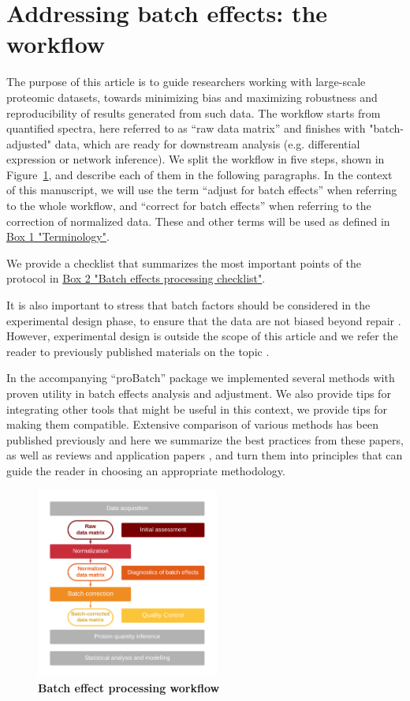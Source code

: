 \documentclass[num-refs]{wiley-article}
\begin{document}
\section{Addressing batch effects: the workflow}

The purpose of this article is to guide researchers working with large-scale proteomic datasets, towards minimizing bias and maximizing robustness and reproducibility of results generated from such data. The workflow starts from quantified spectra, here referred to as “raw data matrix” and finishes with "batch-adjusted" data, which are ready for downstream analysis (e.g. differential expression or network inference). We split the workflow in five steps, shown in Figure~\ref{fig:batch_fig1_workflow}, and describe each of them in the following paragraphs. In the context of this manuscript, we will use the term “adjust for batch effects” when referring to the whole workflow, and “correct for batch effects” when referring to the correction of normalized data. These and other terms will be used as defined in \hyperref[box:Box1_definitions]{Box 1 "Terminology"}. 

We provide a checklist that summarizes the most important points of the protocol in \hyperref[box:Box2_checklist]{Box 2 "Batch effects processing checklist"}.

It is also important to stress that batch factors should be considered in the experimental design phase, to ensure that the data are not biased beyond repair  \cite{Hu2005, Gilad2015}. However, experimental design is outside the scope of this article and we refer the reader to previously published materials on the topic \cite{Oberg2009, Cuklina2020}.
 
In the accompanying “proBatch” package we implemented several methods with proven utility in batch effects analysis and adjustment. We also provide tips for integrating other tools that might be useful in this context, we provide tips for making them compatible. Extensive comparison of various methods has been published previously \cite{Chawade:2014aa, Luo2010} and here we summarize the best practices from these papers, as well as reviews \cite{Lazar:2013aa, Leek:2010aa}  and application papers \cite{Sajic2018, Collins2017}, and turn them into principles that can guide the reader in choosing an appropriate methodology. 


\begin{figure}[bt]
	\center
	\includegraphics[width=6cm]{figures/Fig0_workflow_staircase}
	\caption[Batch effect correction workflow]
	{\textbf{Batch effect processing workflow}}
	\label{fig:batch_fig1_workflow}
\end{figure}
\end{document}
